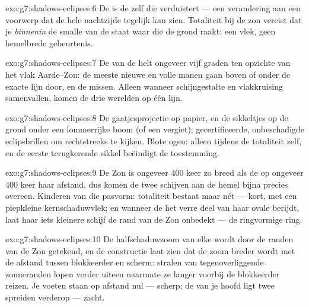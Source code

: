 \begin{solution}{exo:g7:shadows-eclipses:6}
De  is de  zelf die verduistert --- een
verandering aan een voorwerp dat de hele nachtzijde tegelijk kan zien.
Totaliteit bij de zon vereist dat je \emph{binnenin} de smalle
 van de  staat waar die de grond raakt: een vlek,
geen hemelbrede gebeurtenis.
\end{solution}

\begin{solution}{exo:g7:shadows-eclipses:7}
De  van de  helt ongeveer vijf graden ten opzichte van
het vlak Aarde--Zon: de meeste nieuwe en volle manen gaan boven of
onder de exacte lijn door, en de  missen. Alleen wanneer
schijngestalte en vlakkruising samenvallen, komen de drie werelden op
één lijn.
\end{solution}

\begin{solution}{exo:g7:shadows-eclipses:8}
De gaatjesprojectie op papier, en de sikkeltjes op de grond onder een
lommerrijke boom (of een vergiet); gecertificeerde, onbeschadigde
eclipsbrillen om rechtstreeks te kijken. Blote ogen: alleen tijdens de
totaliteit zelf, en de eerste terugkerende sikkel beëindigt de
toestemming.
\end{solution}

\begin{solution}{exo:g7:shadows-eclipses:9}
De Zon is ongeveer $400$ keer zo breed als de  op ongeveer $400$
keer haar afstand, dus komen de twee schijven aan de hemel bijna
precies overeen. Kinderen van die pasvorm: totaliteit bestaat maar
nét --- kort, met een piepkleine kernschaduwvlek; en wanneer de
 het verre deel van haar ovale  berijdt, laat haar
iets kleinere schijf de rand van de Zon onbedekt --- de ringvormige
ring.
\end{solution}

\begin{solution}{exo:g7:shadows-eclipses:10}
De halfschaduwzoom van elke  wordt door de randen van de Zon
getekend, en de constructie laat zien dat de zoom breder wordt met de
afstand tussen blokkeerder en scherm: stralen van tegenoverliggende
zonneranden lopen verder uiteen naarmate ze langer voorbij de
blokkeerder reizen. Je voeten staan op afstand nul --- scherp; de
 van je hoofd ligt twee  spreiden verderop --- zacht.
\end{solution}

